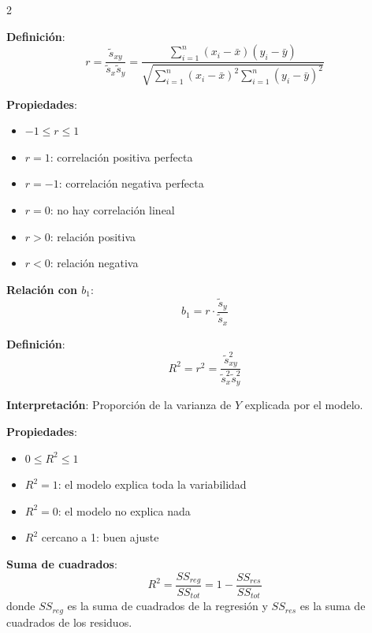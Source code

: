 \documentclass[10pt,a4paper]{article}
\begin{document}
\pagebreak


\begin{multicols}{2}
    \begin{tcolorbox}[title=Coeficiente de Correlación, equal height group=RL1]
        \textbf{Definición}:
        \[
            r = \frac{\tilde{s}_{xy}}{\tilde{s}_x \tilde{s}_y} = \frac{\sum_{i=1}^n (x_i - \bar{x})(y_i - \bar{y})}{\sqrt{\sum_{i=1}^n (x_i - \bar{x})^2 \sum_{i=1}^n (y_i - \bar{y})^2}}
        \]
        
        \textbf{Propiedades}:
        \begin{itemize}
            \item $-1 \leq r \leq 1$
            \item $r = 1$: correlación positiva perfecta
            \item $r = -1$: correlación negativa perfecta
            \item $r = 0$: no hay correlación lineal
            \item $r > 0$: relación positiva
            \item $r < 0$: relación negativa
        \end{itemize}
        
        \textbf{Relación con $b_1$}:
        \[
            b_1 = r \cdot \frac{\tilde{s}_y}{\tilde{s}_x}
        \]
    \end{tcolorbox}
    \begin{tcolorbox}[title=Coeficiente de Determinación $R^2$, equal height group=RL1]
        \textbf{Definición}:
        \[
            R^2 = r^2 = \frac{\tilde{s}_{xy}^2}{\tilde{s}_x^2 \tilde{s}_y^2}
        \]
        
        \textbf{Interpretación}: Proporción de la varianza de $Y$ explicada por el modelo.
        
        \textbf{Propiedades}:
        \begin{itemize}
            \item $0 \leq R^2 \leq 1$
            \item $R^2 = 1$: el modelo explica toda la variabilidad
            \item $R^2 = 0$: el modelo no explica nada
            \item $R^2$ cercano a 1: buen ajuste
        \end{itemize}
        
        \textbf{Suma de cuadrados}:
        \[
            R^2 = \frac{SS_{reg}}{SS_{tot}} = 1 - \frac{SS_{res}}{SS_{tot}}
        \]
        donde $SS_{reg}$ es la suma de cuadrados de la regresión y $SS_{res}$ es la suma de cuadrados de los residuos.
    \end{tcolorbox}
\end{multicols}
\end{document}
